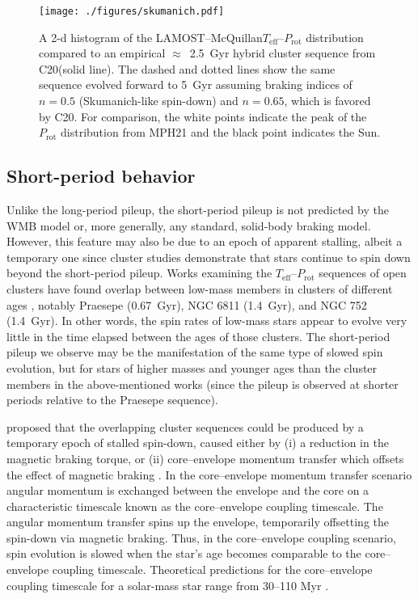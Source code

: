 \documentclass[trackchanges,twocolumn]{aastex631}
\newcommand{\lamostmcq}{LAMOST--McQuillan\xspace}
\newcommand{\masuda}{MPH21\xspace}
\newcommand{\curtis}{C20\xspace}
\newcommand{\teff}{\ensuremath{T_{\mathrm{eff}}}\xspace}
\newcommand{\prot}{\ensuremath{P_\mathrm{rot}}\xspace}
\begin{document}
\begin{figure}
    \centering
    \texttt{[image: ./figures/skumanich.pdf]}
    \caption{A 2-d histogram of the \lamostmcq \teff–\prot distribution compared to an empirical $\approx$~2.5~Gyr hybrid cluster sequence from \curtis (solid line). The dashed and dotted lines show the same sequence evolved forward to 5~Gyr assuming braking indices of $n=0.5$ (Skumanich-like spin-down) and $n=0.65$, which is favored by \curtis. For comparison, the white points indicate the peak of the \prot distribution from \masuda and the black point indicates the Sun.}
    \label{fig:skumanich}    
\end{figure}

\subsection{Short-period behavior} \label{subsec:shortperiod}

Unlike the long-period pileup, the short-period pileup is not predicted by the WMB model or, more generally, any standard, solid-body braking model. However, this feature may also be due to an epoch of apparent stalling, albeit a temporary one since cluster studies demonstrate that stars continue to spin down beyond the short-period pileup. Works examining the \teff–\prot sequences of open clusters have found overlap between low-mass members in clusters of different ages \citep{Agueros2018, Curtis2019a, Curtis2020}, notably Praesepe (0.67~Gyr), NGC 6811 (1.4~Gyr), and NGC 752 (1.4~Gyr). In other words, the spin rates of low-mass stars appear to evolve very little in the time elapsed between the ages of those clusters. The short-period pileup we observe may be the manifestation of the same type of slowed spin evolution, but for stars of higher masses and younger ages than the cluster members in the above-mentioned works (since the pileup is observed at shorter periods relative to the Praesepe sequence). 

\citet{Curtis2019a, Curtis2020} proposed that the overlapping cluster sequences could be produced by a temporary epoch of stalled spin-down, caused either by (i) a reduction in the magnetic braking torque, or (ii) core–envelope momentum transfer which offsets the effect of magnetic braking \citep[e.g.][]{MacGregor1991}. In the core–envelope momentum transfer scenario angular momentum is exchanged between the envelope and the core on a characteristic timescale known as the core–envelope coupling timescale. The angular momentum transfer spins up the envelope, temporarily offsetting the spin-down via magnetic braking. Thus, in the core–envelope coupling scenario, spin evolution is slowed when the star's age becomes comparable to the core–envelope coupling timescale. Theoretical predictions for the core–envelope coupling timescale for a solar-mass star range from 30--110 Myr \citep{MacGregor1991,Krishnamurthi1997, Bouvier2008, IrwinBouvier2009, Denissenkov2010, GalletBouvier2015, Lanzafame2015, Somers2016, Spada2020}. 
\end{document}
